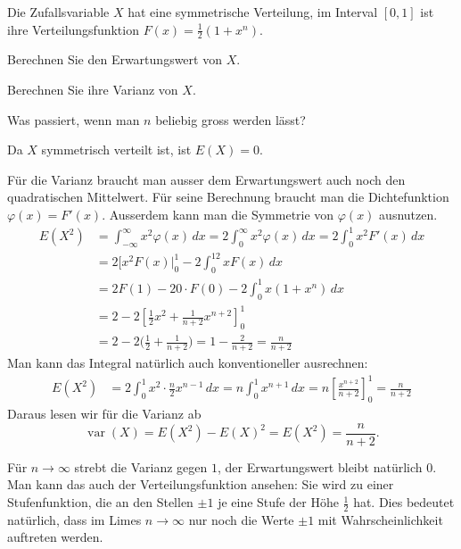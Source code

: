 Die Zufallsvariable $X$ hat eine symmetrische Verteilung, im
Interval $[0,1]$ ist ihre Verteilungsfunktion $F(x)=\frac12(1+x^n)$.
\begin{teilaufgaben}
\item
Berechnen Sie den Erwartungswert von $X$.
\item
Berechnen Sie ihre Varianz von $X$.
\item
Was passiert, wenn man $n$ beliebig gross werden lässt?
\end{teilaufgaben}

\begin{loesung}
\begin{teilaufgaben}
\item Da $X$ symmetrisch verteilt ist, ist $E(X)=0$.
\item
Für die Varianz braucht man ausser dem Erwartungswert auch noch
den quadratischen Mittelwert.  Für seine Berechnung braucht man die
Dichtefunktion $\varphi(x)=F'(x)$. Ausserdem kann man die Symmetrie
von $\varphi(x)$ ausnutzen.
\begin{align*}
E(X^2)
&=
\int_{-\infty}^{\infty}x^2\varphi(x)\,dx
=
2\int_{0}^{\infty}x^2\varphi(x)\,dx
=2\int_0^1 x^2 F'(x)\,dx\\
&=
2[x^2F(x)|_0^1-2\int_0^12xF(x)\,dx
\\
&=
2F(1)-20\cdot F(0)-2\int_0^1x(1+x^n)\,dx
\\
&=
2-2\left[
\frac12x^2+\frac1{n+2}x^{n+2}
\right]_0^1
\\
&=
2-2\biggl(\frac12+\frac1{n+2}\biggr)
=
1-\frac{2}{n+2}
=
\frac{n}{n+2}
\end{align*}
Man kann das Integral natürlich auch konventioneller ausrechnen:
\begin{align*}
E(X^2)&=2\int_0^1x^2\cdot\frac{n}2x^{n-1}\,dx
=
n\int_0^1x^{n+1}\,dx=n\left[\frac{x^{n+2}}{n+2}\right]_0^1
=\frac{n}{n+2}
\end{align*}
Daraus lesen wir für die Varianz ab
\[
\operatorname{var}(X)=E(X^2)-E(X)^2=E(X^2)=\frac{n}{n+2}.
\]
\item
Für $n\to\infty$ strebt die Varianz gegen $1$, der Erwartungswert
bleibt natürlich $0$. Man kann das auch der Verteilungsfunktion
ansehen: Sie wird zu einer Stufenfunktion, die an den Stellen
$\pm 1$ je eine Stufe der Höhe $\frac12$ hat. Dies bedeutet
natürlich, dass im Limes $n\to\infty$ nur noch die Werte $\pm1$ mit
Wahrscheinlichkeit auftreten werden.
\qedhere
\end{teilaufgaben}
\end{loesung}

